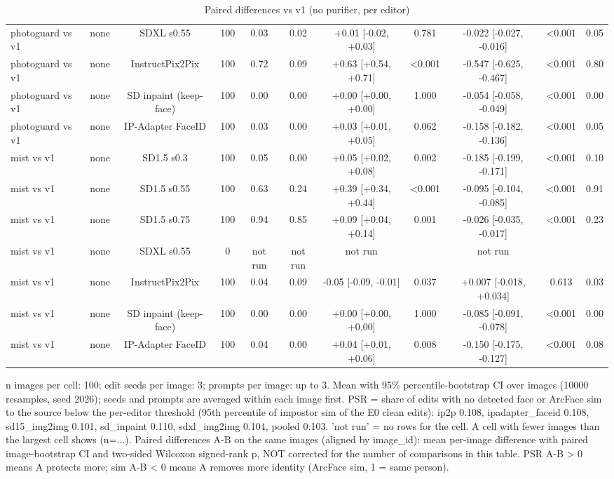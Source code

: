 \begin{table}[t]
{\begin{tabular}{lcccccccccc}
photoguard vs v1 & none & SDXL s0.55 & 100 & 0.03 & 0.02 & +0.01 [-0.02, +0.03] & 0.781 & -0.022 [-0.027, -0.016] & <0.001 & 0.05 \\
photoguard vs v1 & none & InstructPix2Pix & 100 & 0.72 & 0.09 & +0.63 [+0.54, +0.71] & <0.001 & -0.547 [-0.625, -0.467] & <0.001 & 0.80 \\
photoguard vs v1 & none & SD inpaint (keep-face) & 100 & 0.00 & 0.00 & +0.00 [+0.00, +0.00] & 1.000 & -0.054 [-0.058, -0.049] & <0.001 & 0.00 \\
photoguard vs v1 & none & IP-Adapter FaceID & 100 & 0.03 & 0.00 & +0.03 [+0.01, +0.05] & 0.062 & -0.158 [-0.182, -0.136] & <0.001 & 0.05 \\
mist vs v1 & none & SD1.5 s0.3 & 100 & 0.05 & 0.00 & +0.05 [+0.02, +0.08] & 0.002 & -0.185 [-0.199, -0.171] & <0.001 & 0.10 \\
mist vs v1 & none & SD1.5 s0.55 & 100 & 0.63 & 0.24 & +0.39 [+0.34, +0.44] & <0.001 & -0.095 [-0.104, -0.085] & <0.001 & 0.91 \\
mist vs v1 & none & SD1.5 s0.75 & 100 & 0.94 & 0.85 & +0.09 [+0.04, +0.14] & 0.001 & -0.026 [-0.035, -0.017] & <0.001 & 0.23 \\
mist vs v1 & none & SDXL s0.55 & 0 & not run & not run & not run &  & not run &  &  \\
mist vs v1 & none & InstructPix2Pix & 100 & 0.04 & 0.09 & -0.05 [-0.09, -0.01] & 0.037 & +0.007 [-0.018, +0.034] & 0.613 & 0.03 \\
mist vs v1 & none & SD inpaint (keep-face) & 100 & 0.00 & 0.00 & +0.00 [+0.00, +0.00] & 1.000 & -0.085 [-0.091, -0.078] & <0.001 & 0.00 \\
mist vs v1 & none & IP-Adapter FaceID & 100 & 0.04 & 0.00 & +0.04 [+0.01, +0.06] & 0.008 & -0.150 [-0.175, -0.127] & <0.001 & 0.08 \\
\bottomrule
\end{tabular}
}
\caption{Paired differences vs v1 (no purifier, per editor)}
\label{tab:paired_vs_v1}
\par\footnotesize n images per cell: 100; edit seeds per image: 3; prompts per image: up to 3. Mean with 95\% percentile-bootstrap CI over images (10000 resamples, seed 2026); seeds and prompts are averaged within each image first. PSR = share of edits with no detected face or ArcFace sim to the source below the per-editor threshold (95th percentile of impostor sim of the E0 clean edits): ip2p 0.108, ipadapter\_faceid 0.108, sd15\_img2img 0.101, sd\_inpaint 0.110, sdxl\_img2img 0.104, pooled 0.103. 'not run' = no rows for the cell. A cell with fewer images than the largest cell shows (n=...). Paired differences A-B on the same images (aligned by image\_id): mean per-image difference with paired image-bootstrap CI and two-sided Wilcoxon signed-rank p, NOT corrected for the number of comparisons in this table. PSR A-B > 0 means A protects more; sim A-B < 0 means A removes more identity (ArcFace sim, 1 = same person).
\end{table}
